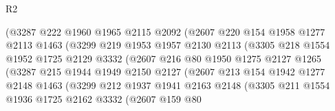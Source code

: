 \begin{lexlean}{R2}
\begin{coremodule}
                          (@3287
                            @222
                            @1960
                            @1965
                            @2115
                            @2092
                            (@2607
                              @220
                              @154
                              @1958
                              @1277
                              @2113
                              @1463
                              (@3299
                                @219
                                @1953
                                @1957
                                @2130
                                @2113
                                (@3305
                                  @218
                                  @1554
                                  @1952
                                  @1725
                                  @2129
                                  @3332
                                  (@2607
                                    @216
                                    @80
                                    @1950
                                    @1275
                                    @2127
                                    @1265
                                    (@3287
                                      @215
                                      @1944
                                      @1949
                                      @2150
                                      @2127
                                      (@2607
                                        @213
                                        @154
                                        @1942
                                        @1277
                                        @2148
                                        @1463
                                        (@3299
                                          @212
                                          @1937
                                          @1941
                                          @2163
                                          @2148
                                          (@3305
                                            @211
                                            @1554
                                            @1936
                                            @1725
                                            @2162
                                            @3332
                                            (@2607
                                              @159
                                              @80

\end{coremodule}
\end{lexlean}
